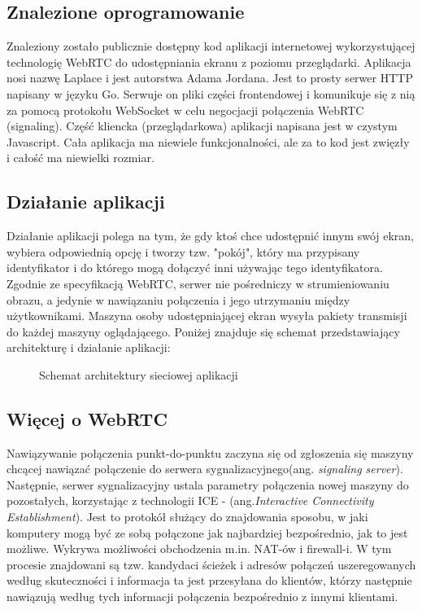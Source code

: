 \documentclass[a4paper,11pt]{article}
\begin{document}
        \subsection{Znalezione oprogramowanie}
        Znaleziony zostało publicznie dostępny kod aplikacji internetowej wykorzystującej technologię WebRTC do udostępniania ekranu z poziomu przeglądarki.
        Aplikacja \cite{2} nosi nazwę Laplace i jest autorstwa Adama Jordana.
        Jest to prosty serwer HTTP napisany w języku Go. 
        Serwuje on pliki części frontendowej i komunikuje się z nią za pomocą protokołu WebSocket w celu negocjacji połączenia WebRTC (signaling). 
        Część kliencka (przeglądarkowa) aplikacji napisana jest w czystym Javascript. Cała aplikacja ma niewiele funkcjonalności, ale za to kod jest zwięzły i całość ma niewielki rozmiar.
        \subsection{Działanie aplikacji}
        Działanie aplikacji polega na tym, że gdy ktoś chce udostępnić innym swój ekran, wybiera odpowiednią opcję i tworzy tzw. "pokój", 
        który ma przypisany identyfikator i do którego mogą dołączyć inni używając tego identyfikatora. 
        Zgodnie ze specyfikacją WebRTC, serwer nie pośredniczy w strumieniowaniu obrazu, a jedynie w nawiązaniu połączenia i jego utrzymaniu między użytkownikami.   
        Maszyna osoby udostępniającej ekran wysyła pakiety transmisji do każdej maszyny oglądającego. 
        Poniżej znajduje się schemat przedstawiający architekturę i działanie aplikacji: 
        \begin{figure}[H]
        \centering
        \def\svgwidth{\columnwidth}
        
        \caption{Schemat architektury sieciowej aplikacji}
        \label{rys1:label}
        \end{figure}
        \subsection{Więcej o WebRTC}
        Nawiązywanie połączenia punkt-do-punktu zaczyna się od zgłoszenia się maszyny chcącej nawiązać połączenie do serwera sygnalizacyjnego(ang. \emph{signaling server}).
        Następnie, serwer sygnalizacyjny ustala parametry połączenia nowej maszyny do pozostałych, korzystając z technologii ICE - (ang.\emph{Interactive Connectivity Establishment}).
        Jest to protokół służący do znajdowania sposobu, w jaki komputery mogą być ze sobą połączone jak najbardziej bezpośrednio, jak to jest możliwe. 
        Wykrywa możliwości obchodzenia m.in. NAT-ów i firewall-i. 
        W tym procesie znajdowani są tzw. kandydaci ścieżek i adresów połączeń uszeregowanych według skuteczności i informacja ta jest przesyłana do klientów, 
        którzy następnie nawiązują według tych informacji połączenia bezpośrednio z innymi klientami.  
\end{document}
